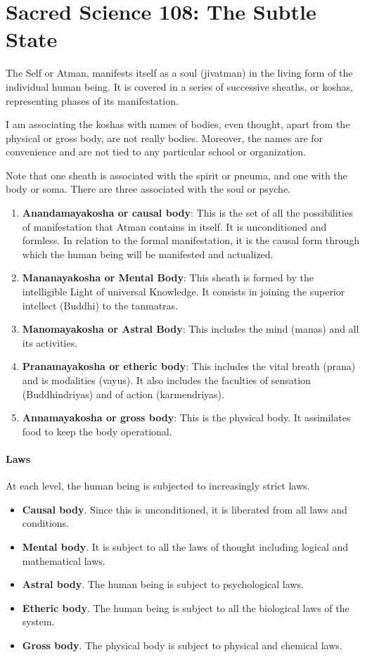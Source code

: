 \section{Sacred Science 108: The Subtle State}

The Self or Atman, manifests itself as a soul (jivatman) in the living form of the individual human being. It is covered in a series of successive sheaths, or koshas, representing phases of its manifestation.

I am associating the koshas with names of bodies, even thought, apart from the physical or gross body, are not really bodies. Moreover, the names are for convenience and are not tied to any particular school or organization.

Note that one sheath is associated with the spirit or pneuma, and one with the body or soma. There are three associated with the soul or psyche.

\begin{enumerate}
\item \textbf{Anandamayakosha or causal body}: This is the set of all the possibilities of manifestation that Atman contains in itself. It is unconditioned and formless. In relation to the formal manifestation, it is the causal form through which the human being will be manifested and actualized. 
\item \textbf{Mananayakosha or Mental Body}: This sheath is formed by the intelligible Light of universal Knowledge. It consists in joining the superior intellect (Buddhi) to the tanmatras. 
\item \textbf{Manomayakosha or Astral Body}: This includes the mind (manas) and all its activities. 
\item \textbf{Pranamayakosha or etheric body}: This includes the vital breath (prana) and is modalities (vayus). It also includes the faculties of sensation (Buddhindriyas) and of action (karmendriyas). 
\item \textbf{Annamayakosha or gross body}: This is the physical body. It assimilates food to keep the body operational. 
\end{enumerate}

\paragraph{Laws}
At each level, the human being is subjected to increasingly strict laws.

\begin{itemize}
\item \textbf{Causal body}. Since this is unconditioned, it is liberated from all laws and conditions. 
\item \textbf{Mental body}. It is subject to all the laws of thought including logical and mathematical laws. 
\item \textbf{Astral body}. The human being is subject to psychological laws. 
\item \textbf{Etheric body}. The human being is subject to all the biological laws of the system. 
\item \textbf{Gross body}. The physical body is subject to physical and chemical laws. 
\end{itemize}

